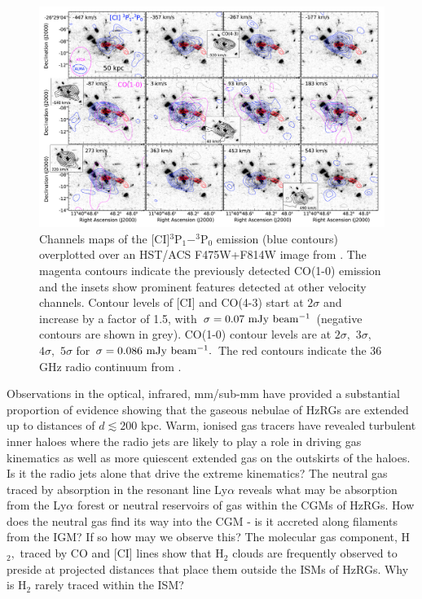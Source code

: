 \documentclass[10pt,a4paper]{article}
\begin{document}
\begin{figure}
 \centering
 \includegraphics[width=\textwidth]{plots_chp1/Spiderweb_glx_CI_Emonts2018.png}
 \caption[Channels maps of CO(1-0) in MRC1138-262 from \citet{emonts2018}]{Channels maps of the [CI]$^3$P$_1-^3$P$_0$ emission (blue contours) overplotted over an HST/ACS F475W+F814W image from \citet{Miley2006}. The magenta contours indicate the previously detected CO(1-0) emission and the insets show prominent features detected at other velocity channels. Contour levels of [CI] and CO(4-3) start at $2\sigma$ and increase by a factor of 1.5, with $\rm \sigma=0.07~mJy~beam^{-1}$ (negative contours are shown in grey). CO(1-0) contour levels are at $2\sigma,$ $3\sigma,$ $4\sigma,$ $5\sigma$ for $\rm \sigma=0.086~mJy~beam^{-1}.$ The red contours indicate the 36 GHz radio continuum from \citet{Emonts2016}.}
 \label{fig:CI-Spiderweb-Emonts2018}
\end{figure}

Observations in the optical, infrared, mm/sub-mm have provided a substantial proportion of evidence showing that the gaseous nebulae of HzRGs are extended up to distances of $d \lesssim 200$ kpc. Warm, ionised gas tracers have revealed turbulent inner haloes where the radio jets are likely to play a role in driving gas kinematics as well as more quiescent extended gas on the outskirts of the haloes. Is it the radio jets alone that drive the extreme kinematics? The neutral gas traced by absorption in the resonant line Ly$\alpha$ reveals what may be absorption from the Ly$\alpha$ forest or neutral reservoirs of gas within the CGMs of HzRGs. How does the neutral gas find its way into the CGM - is it accreted along filaments from the IGM? If so how may we observe this? The molecular gas component, H$_2,$ traced by CO and [CI] lines show that H$_2$ clouds are frequently observed to preside at projected distances that place them outside the ISMs of HzRGs. Why is H$_2$ rarely traced within the ISM? 
\end{document}
